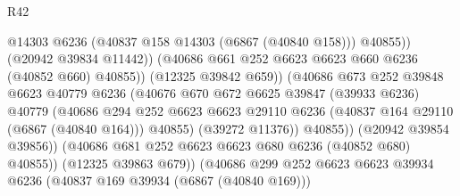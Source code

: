 \begin{lexlean}{R42}
\begin{coremodule}
{                                                @14303
                                                @6236
                                                (@40837 @158 @14303 (@6867 (@40840 @158)))
                                                @40855))
                                            (@20942 @39834 @11442))
                                          (@40686
                                            @661
                                            @252
                                            @6623
                                            @6623
                                            @660
                                            @6236
                                            (@40852 @660)
                                            @40855))
                                        (@12325 @39842 @659))
                                      (@40686
                                        @673
                                        @252
                                        @39848
                                        @6623
                                        @40779
                                        @6236
                                        (@40676
                                          @670
                                          @672
                                          @6625
                                          @39847
                                          (@39933 @6236)
                                          @40779
                                          (@40686
                                            @294
                                            @252
                                            @6623
                                            @6623
                                            @29110
                                            @6236
                                            (@40837 @164 @29110 (@6867 (@40840 @164)))
                                            @40855)
                                          (@39272 @11376))
                                        @40855))
                                    (@20942 @39854 @39856))
                                  (@40686 @681 @252 @6623 @6623 @680 @6236 (@40852 @680) @40855))
                                (@12325 @39863 @679))
                              (@40686
                                @299
                                @252
                                @6623
                                @6623
                                @39934
                                @6236
                                (@40837 @169 @39934 (@6867 (@40840 @169)))
}
\end{coremodule}
\end{lexlean}
